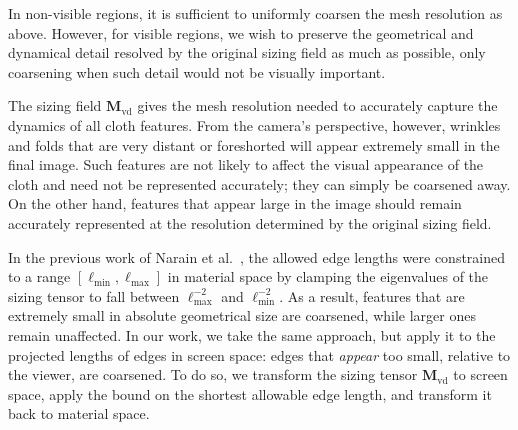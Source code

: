 \documentclass[10pt,journal,compsoc,twoside]{TexInputs/IEEEtran}
\begin{document}
In non-visible regions, it is sufficient to uniformly coarsen the mesh resolution as above.
However, for visible regions, we wish to preserve the geometrical and dynamical detail resolved by the original sizing field as much as possible, only coarsening when such detail would not be visually important.

The sizing field $\mathbf M_{\text{vd}}$ gives the mesh resolution needed to accurately capture the dynamics of all cloth features.
From the camera's perspective, however, wrinkles and folds that are very distant or foreshorted will appear extremely small in the final image.
Such features are not likely to affect the visual appearance of the cloth and need not be represented accurately; they can simply be coarsened away.
On the other hand, features that appear large in the image should remain accurately represented at the resolution determined by the original sizing field.




In the previous work of Narain et al.~\cite{Narain:2012:AAR}, the allowed edge lengths were constrained to a range $[\ell_{\min},\ell_{\max}]$ in material space by clamping the eigenvalues of the sizing tensor to fall between $\ell_{\max}^{-2}$ and $\ell_{\min}^{-2}$.
As a result, features that are extremely small in absolute geometrical size are coarsened, while larger ones remain unaffected.
In our work, we take the same approach, but apply it to the projected lengths of edges in screen space: edges that \emph{appear} too small, relative to the viewer, are coarsened.
To do so, we transform the sizing tensor $\mathbf{M}_{\text{vd}}$ to screen space, apply the bound on the shortest allowable edge length, and transform it back to material space.
\end{document}
